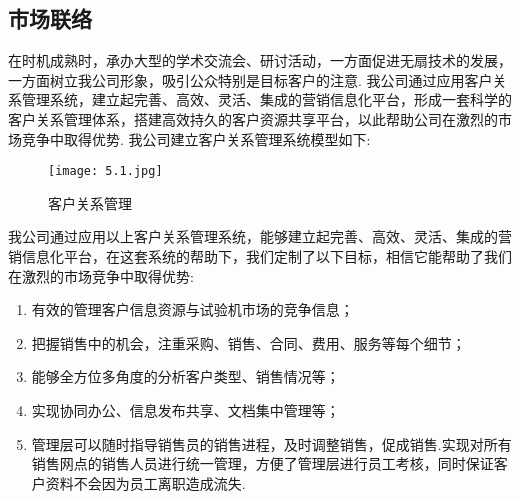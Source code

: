 \subsection{市场联络}
在时机成熟时，承办大型的学术交流会、研讨活动，一方面促进无扇技术的发展，一方面树立我公司形象，吸引公众特别是目标客户的注意.
我公司通过应用客户关系管理系统，建立起完善、高效、灵活、集成的营销信息化平台，形成一套科学的客户关系管理体系，搭建高效持久的客户资源共享平台，以此帮助公司在激烈的市场竞争中取得优势.
我公司建立客户关系管理系统模型如下:
\begin{figure}[H]
\centering
\texttt{[image: 5.1.jpg]}
\caption{客户关系管理}
\label{客户关系管理}
\end{figure}

我公司通过应用以上客户关系管理系统，能够建立起完善、高效、灵活、集成的营销信息化平台，在这套系统的帮助下，我们定制了以下目标，相信它能帮助了我们在激烈的市场竞争中取得优势:
\begin{enumerate}
\item 有效的管理客户信息资源与试验机市场的竞争信息；
\item 把握销售中的机会，注重采购、销售、合同、费用、服务等每个细节；
\item 能够全方位多角度的分析客户类型、销售情况等；
\item 实现协同办公、信息发布共享、文档集中管理等；
\item 管理层可以随时指导销售员的销售进程，及时调整销售，促成销售.实现对所有销售网点的销售人员进行统一管理，方便了管理层进行员工考核，同时保证客户资料不会因为员工离职造成流失.
\end{enumerate}
